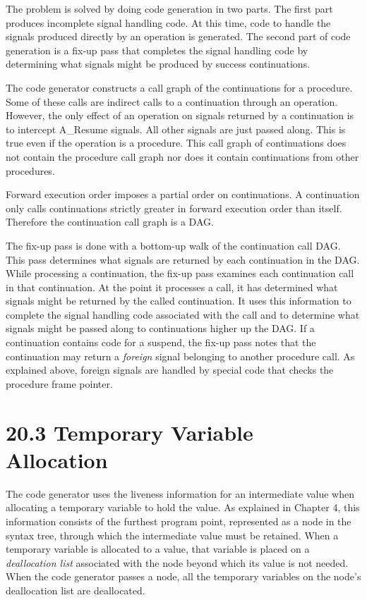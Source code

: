 The problem is solved by doing code generation in two parts. The first
part produces incomplete signal handling code. At this time, code to
handle the signals produced directly by an operation is generated. The
second part of code generation is a fix-up pass that completes the
signal handling code by determining what signals might be produced by
success continuations.

The code generator constructs a call graph of the continuations for a
procedure. Some of these calls are indirect calls to a continuation
through an operation. However, the only effect of an operation on
signals returned by a continuation is to intercept A\_Resume
signals. All other signals are just passed along. This is true even if
the operation is a procedure. This call graph of continuations does
not contain the procedure call graph nor does it contain continuations
from other procedures.

Forward execution order imposes a partial order on continuations. A
continuation only calls continuations strictly greater in forward
execution order than itself. Therefore the continuation call graph is
a DAG.

The fix-up pass is done with a bottom-up walk of the continuation call
DAG. This pass determines what signals are returned by each
continuation in the DAG. While processing a continuation, the fix-up
pass examines each continuation call in that continuation. At the
point it processes a call, it has determined what signals might be
returned by the called continuation. It uses this information to
complete the signal handling code associated with the call and to
determine what signals might be passed along to continuations higher
up the DAG. If a continuation contains code for a suspend, the fix-up
pass notes that the continuation may return a \textit{foreign} signal
belonging to another procedure call. As explained above, foreign
signals are handled by special code that checks the procedure frame
pointer.


\section[20.3 Temporary Variable Allocation]{20.3 Temporary Variable Allocation}

The code generator uses the liveness information for an intermediate
value when allocating a temporary variable to hold the value. As
explained in Chapter 4, this information consists of the furthest
program point, represented as a node in the syntax tree, through which
the intermediate value must be retained. When a temporary variable is
allocated to a value, that variable is placed on a
\textit{deallocation list} associated with the node beyond which its
value is not needed. When the code generator passes a node, all the
temporary variables on the node's deallocation list are deallocated.

